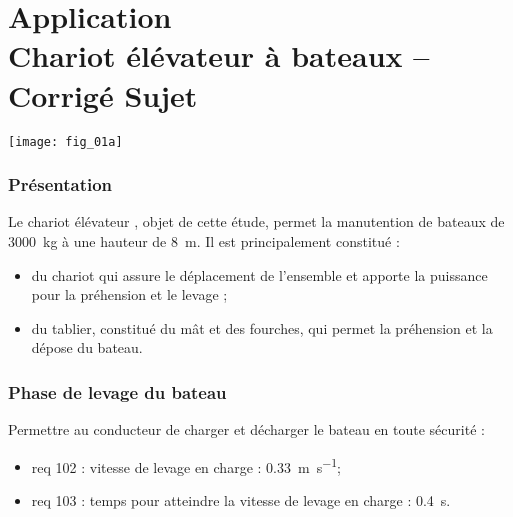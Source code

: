 \chapter*{Application  \\ 
Chariot élévateur à bateaux -- \ifprof Corrigé \else Sujet \fi}

\iflivret {} \else
\ifprof  {} \else \fi
\fi

\setcounter{question}{0}


\begin{marginfigure} [4cm]
\texttt{[image: fig\_01a]}
\end{marginfigure}

\subsection*{Présentation}
\ifprof
\else
Le chariot élévateur , objet de cette étude,  permet la manutention de bateaux de \SI{3000}{kg}
à une hauteur de \SI{8}{m}. Il est principalement constitué :
\begin{itemize}
\item du chariot qui assure le déplacement de l’ensemble et apporte la puissance pour la préhension
et le levage ;
\item du tablier, constitué du mât et des fourches, qui permet la préhension et la dépose du bateau.
\end{itemize}




\subsection*{Phase de levage du bateau}
\begin{obj}
Permettre au conducteur de charger et décharger le bateau en toute sécurité : 
\begin{itemize}
\item req 102 : vitesse de levage en charge : \SI{0,33}{m.s^{-1}};
\item req 103 : temps pour atteindre la vitesse de levage en charge : \SI{0,4}{s}.
\end{itemize}
\end{obj}



